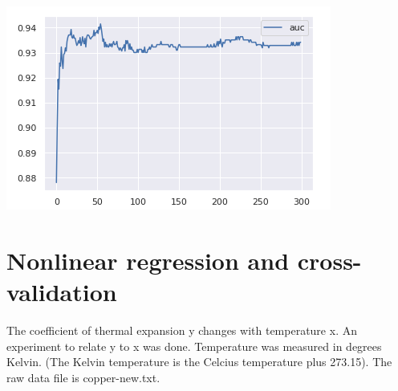 \documentclass[a4paper]{article}
\begin{document}
\begin{enumerate}
\includegraphics[width=\textwidth]{auc.png}



\end{enumerate}
\section{Nonlinear regression and cross-validation}

The coefficient of thermal expansion y changes with temperature x. An experiment to relate
y to x was done. Temperature was measured in degrees Kelvin. (The Kelvin temperature is
the Celcius temperature plus 273.15). The raw data file is copper-new.txt.
\end{document}
